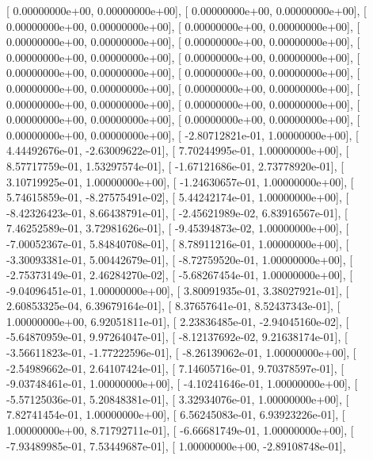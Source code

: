 \documentclass{article}
\begin{document}
       [  0.00000000e+00,   0.00000000e+00],
       [  0.00000000e+00,   0.00000000e+00],
       [  0.00000000e+00,   0.00000000e+00],
       [  0.00000000e+00,   0.00000000e+00],
       [  0.00000000e+00,   0.00000000e+00],
       [  0.00000000e+00,   0.00000000e+00],
       [  0.00000000e+00,   0.00000000e+00],
       [  0.00000000e+00,   0.00000000e+00],
       [  0.00000000e+00,   0.00000000e+00],
       [  0.00000000e+00,   0.00000000e+00],
       [  0.00000000e+00,   0.00000000e+00],
       [  0.00000000e+00,   0.00000000e+00],
       [  0.00000000e+00,   0.00000000e+00],
       [  0.00000000e+00,   0.00000000e+00],
       [  0.00000000e+00,   0.00000000e+00],
       [  0.00000000e+00,   0.00000000e+00],
       [  0.00000000e+00,   0.00000000e+00],
       [ -2.80712821e-01,   1.00000000e+00],
       [  4.44492676e-01,  -2.63009622e-01],
       [  7.70244995e-01,   1.00000000e+00],
       [  8.57717759e-01,   1.53297574e-01],
       [ -1.67121686e-01,   2.73778920e-01],
       [  3.10719925e-01,   1.00000000e+00],
       [ -1.24630657e-01,   1.00000000e+00],
       [  5.74615859e-01,  -8.27575491e-02],
       [  5.44242174e-01,   1.00000000e+00],
       [ -8.42326423e-01,   8.66438791e-01],
       [ -2.45621989e-02,   6.83916567e-01],
       [  7.46252589e-01,   3.72981626e-01],
       [ -9.45394873e-02,   1.00000000e+00],
       [ -7.00052367e-01,   5.84840708e-01],
       [  8.78911216e-01,   1.00000000e+00],
       [ -3.30093381e-01,   5.00442679e-01],
       [ -8.72759520e-01,   1.00000000e+00],
       [ -2.75373149e-01,   2.46284270e-02],
       [ -5.68267454e-01,   1.00000000e+00],
       [ -9.04096451e-01,   1.00000000e+00],
       [  3.80091935e-01,   3.38027921e-01],
       [  2.60853325e-04,   6.39679164e-01],
       [  8.37657641e-01,   8.52437343e-01],
       [  1.00000000e+00,   6.92051811e-01],
       [  2.23836485e-01,  -2.94045160e-02],
       [ -5.64870959e-01,   9.97264047e-01],
       [ -8.12137692e-02,   9.21638174e-01],
       [ -3.56611823e-01,  -1.77222596e-01],
       [ -8.26139062e-01,   1.00000000e+00],
       [ -2.54989662e-01,   2.64107424e-01],
       [  7.14605716e-01,   9.70378597e-01],
       [ -9.03748461e-01,   1.00000000e+00],
       [ -4.10241646e-01,   1.00000000e+00],
       [ -5.57125036e-01,   5.20848381e-01],
       [  3.32934076e-01,   1.00000000e+00],
       [  7.82741454e-01,   1.00000000e+00],
       [  6.56245083e-01,   6.93923226e-01],
       [  1.00000000e+00,   8.71792711e-01],
       [ -6.66681749e-01,   1.00000000e+00],
       [ -7.93489985e-01,   7.53449687e-01],
       [  1.00000000e+00,  -2.89108748e-01],
\end{document}
